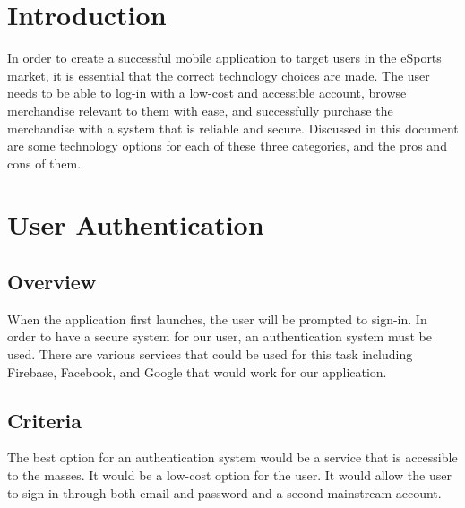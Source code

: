 \documentclass[onecolumn, draftclsnofoot,10pt, compsoc]{IEEEtran}
\begin{document}
\begin{titlepage}
\begin{singlespace}
\begin{abstract}
        \end{abstract}     
    \end{singlespace}
\end{titlepage}
\newpage
{}
\tableofcontents
\clearpage


\section{Introduction}
In order to create a successful mobile application to target users in the eSports market, it is essential that the correct technology choices are made. The user needs to be able to log-in with a low-cost and accessible account, browse merchandise relevant to them with ease, and successfully purchase the merchandise with a system that is reliable and secure. Discussed in this document are some technology options for each of these three categories, and the pros and cons of them.

\section{User Authentication}

\subsection{Overview}
When the application first launches, the user will be prompted to sign-in. In order to have a secure system for our user, an authentication system must be used. There are various services that could be used for this task including Firebase, Facebook, and Google that would work for our application. 

\subsection{Criteria}
The best option for an authentication system would be a service that is accessible to the masses. It would be a low-cost option for the user. It would allow the user to sign-in through both email and password and a second mainstream account. 
\end{document}
